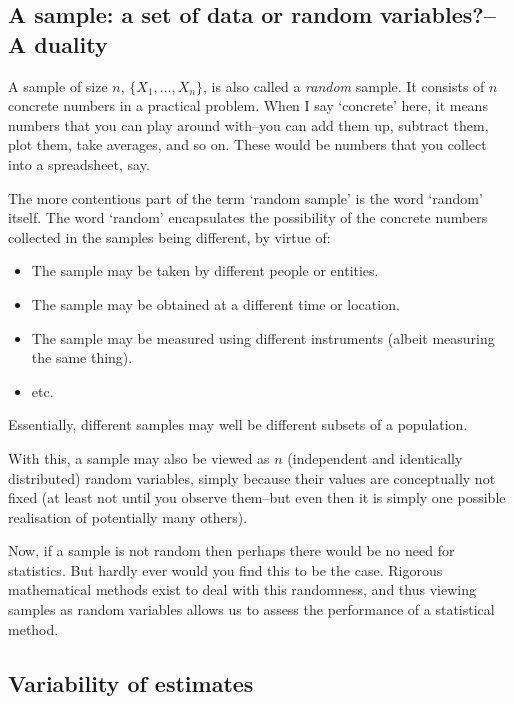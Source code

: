 \documentclass[
]{book}
\providecommand{\tightlist}{%
  \setlength{\itemsep}{0pt}\setlength{\parskip}{0pt}}
\theoremstyle{definition}
\theoremstyle{definition}
\theoremstyle{definition}
\theoremstyle{definition}
\theoremstyle{remark}
\begin{document}
\hypertarget{a-sample-a-set-of-data-or-random-variablesa-duality}{%
\subsection*{A sample: a set of data or random variables?--A duality}\label{a-sample-a-set-of-data-or-random-variablesa-duality}}

A sample of size \(n\), \(\{X_1,\dots,X_n\}\), is also called a \emph{random} sample. It consists of \(n\) concrete numbers in a practical problem.
When I say `concrete' here, it means numbers that you can play around with--you can add them up, subtract them, plot them, take averages, and so on.
These would be numbers that you collect into a spreadsheet, say.

The more contentious part of the term `random sample' is the word `random' itself.
The word `random' encapsulates the possibility of the concrete numbers collected in the samples being different, by virtue of:

\begin{itemize}
\tightlist
\item
  The sample may be taken by different people or entities.
\item
  The sample may be obtained at a different time or location.
\item
  The sample may be measured using different instruments (albeit measuring the same thing).
\item
  etc.
\end{itemize}

Essentially, different samples may well be different subsets of a population.

With this, a sample may also be viewed as \(n\) (independent and identically distributed) random variables, simply because their values are conceptually not fixed (at least not until you observe them--but even then it is simply one possible realisation of potentially many others).

Now, if a sample is not random then perhaps there would be no need for statistics. But hardly ever would you find this to be the case.
Rigorous mathematical methods exist to deal with this randomness, and thus viewing samples as random variables allows us to assess the performance of a statistical method.

\hypertarget{variability-of-estimates}{%
\subsection*{Variability of estimates}\label{variability-of-estimates}}
\end{document}
